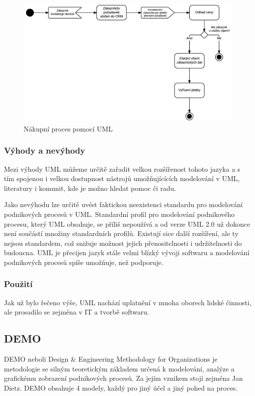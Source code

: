 \documentclass[]{article}
\begin{document}
\begin{figure}[H]\centering
\includegraphics[width=1.0\textwidth]{obrazky/uml_nakupniproces}
\caption{Nákupní proces pomocí UML}
\label{fig:UML_nakupniproces}
\end{figure}

\subsubsection{Výhody a nevýhody}
Mezi výhody UML můžeme určitě zařadit velkou rozšířenost tohoto jazyka a s tím spojenou i velkou dostupnost nástrojů umožňujícících modelování v UML, literatury i komunit, kde je možno hledat pomoc či radu.

Jako nevýhodu lze určitě uvést faktickou neexistenci standardu pro modelování podnikových procesů v UML. Standardní profil pro modelování podnikového procesu, který UML obsahuje, se příliš nepoužívá a od verze UML 2.0 už dokonce není součástí množiny standardních profilů. \cite{Repa2007} Existují sice další rozšíření, ale ty nejsou standardem, což snižuje možnost jejich přenositelnosti i udržitelnosti do budoucna. UML je přecijen jazyk stále velmi blízký vývoji softwaru a modelování podnikových procesů spíše umožňuje, než podporuje.

\subsubsection{Použití}
Jak už bylo řečeno výše, UML nachází uplatnění v mnoha oborech lidské činnosti, ale prosadilo se zejména v IT a tvorbě softwaru. 

\subsection{DEMO}
DEMO neboli Design \& Engineering Methodology for Organizations je metodologie se silným teoretickým základem určená k modelování, analýze a grafickému zobrazení podnikových procesů. Za jejím vznikem stojí zejména Jan Dietz. DEMO obsahuje 4 modely, každý pro jiný účel a jiný pohed na proces.
\end{document}
